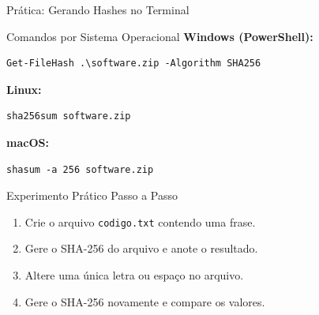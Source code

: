 \documentclass[9pt]{beamer}
\begin{document}
\begin{frame}[fragile]{Prática: Gerando Hashes no Terminal}
  \begin{block}{Comandos por Sistema Operacional}
    \scriptsize
    \textbf{Windows (PowerShell):}
    \begin{verbatim}
Get-FileHash .\software.zip -Algorithm SHA256
    \end{verbatim}

    \textbf{Linux:}
    \begin{verbatim}
sha256sum software.zip
    \end{verbatim}

    \textbf{macOS:}
    \begin{verbatim}
shasum -a 256 software.zip
    \end{verbatim}
  \end{block}

  \begin{block}{Experimento Prático Passo a Passo}
    \small
    \begin{enumerate}
      \item Crie o arquivo \texttt{codigo.txt} contendo uma frase.
      \item Gere o SHA-256 do arquivo e anote o resultado.
      \item Altere uma única letra ou espaço no arquivo.
      \item Gere o SHA-256 novamente e compare os valores.
    \end{enumerate}
  \end{block}
\end{frame}
\end{document}
